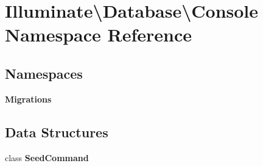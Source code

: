 \section{Illuminate\textbackslash{}Database\textbackslash{}Console Namespace Reference}
\label{namespace_illuminate_1_1_database_1_1_console}
\subsection*{Namespaces}
\begin{DoxyCompactItemize}
\item 
 {\bf Migrations}
\end{DoxyCompactItemize}
\subsection*{Data Structures}
\begin{DoxyCompactItemize}
\item 
class {\bf Seed\+Command}
\end{DoxyCompactItemize}
